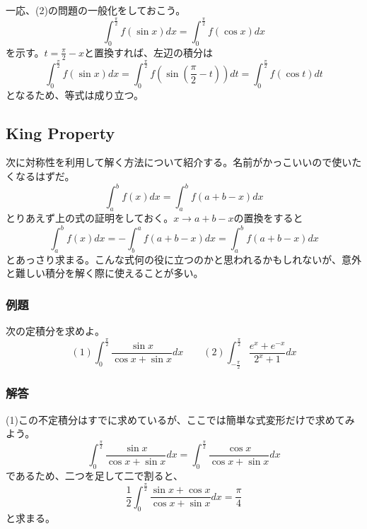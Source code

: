 \documentclass[a4j,dvipdfmx]{jsarticle}
\begin{document}
\subsubsection*{}
一応、(2)の問題の一般化をしておこう。
\begin{equation*}
    \int_0^{\frac{\pi}{2}}f(\sin x)dx=\int_0^{\frac{\pi}{2}}f(\cos x)dx
\end{equation*}
を示す。$t=\frac{\pi}{2}-x$と置換すれば、左辺の積分は
\begin{equation*}
    \int_0^{\frac{\pi}{2}}f(\sin x)dx=\int_0^{\frac{\pi}{2}}f(\sin(\frac{\pi}{2}-t))dt=\int_0^{\frac{\pi}{2}}f(\cos t)dt
\end{equation*}
となるため、等式は成り立つ。
\newpage
\subsection{King Property}
次に対称性を利用して解く方法について紹介する。名前がかっこいいので使いたくなるはずだ。
\begin{equation*}
    \int_a^b f(x)dx=\int_a^b f(a+b-x)dx
\end{equation*}
とりあえず上の式の証明をしておく。$x\to a+b-x$の置換をすると
\begin{equation*}
    \int_a^b f(x)dx=-\int_b^a f(a+b-x)dx=\int_a^b f(a+b-x)dx
\end{equation*}
とあっさり求まる。こんな式何の役に立つのかと思われるかもしれないが、意外と難しい積分を解く際に使えることが多い。
\subsubsection*{例題}
次の定積分を求めよ。
\begin{equation*}
    (1)\int_0^\frac{\pi}{2}\frac{\sin x}{\cos x+\sin x}dx\qquad(2)\int_{-\frac{\pi}{2}}^\frac{\pi}{2}\frac{e^x+e^{-x}}{2^x+1}dx
\end{equation*}
\subsubsection*{解答}
(1)この不定積分はすでに求めているが、ここでは簡単な式変形だけで求めてみよう。
\begin{equation*}
    \int_0^\frac{\pi}{2}\frac{\sin x}{\cos x+\sin x}dx=\int_0^\frac{\pi}{2}\frac{\cos x}{\cos x+\sin x}dx
\end{equation*}
であるため、二つを足して二で割ると、
\begin{equation*}
    \frac{1}{2}\int_0^\frac{\pi}{2}\frac{\sin x+\cos x}{\cos x+\sin x}dx=\frac{\pi}{4}
\end{equation*}
と求まる。
\end{document}
